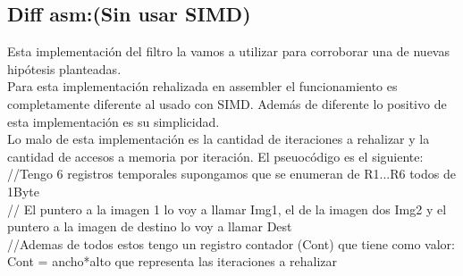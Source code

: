 \subsection{Diff asm:(Sin usar SIMD)}
Esta implementación del filtro la vamos a utilizar para corroborar una de nuevas hipótesis planteadas. \\
Para esta implementación rehalizada en assembler el funcionamiento es completamente diferente al usado con SIMD. Además de diferente lo positivo de esta implementación es su simplicidad. \\
Lo malo de esta implementación es la cantidad de iteraciones a rehalizar y la cantidad de accesos a memoria por iteración.
 El pseuocódigo es el siguiente:\\
//Tengo 6 registros temporales supongamos que se enumeran de R1...R6 todos de 1Byte\\
// El puntero a la imagen 1 lo voy a llamar Img1, el de la imagen dos Img2 y el puntero a la imagen de destino lo voy a llamar Dest\\
//Ademas de todos estos tengo un registro contador (Cont) que tiene como valor: Cont = ancho*alto que representa las iteraciones a rehalizar\\

